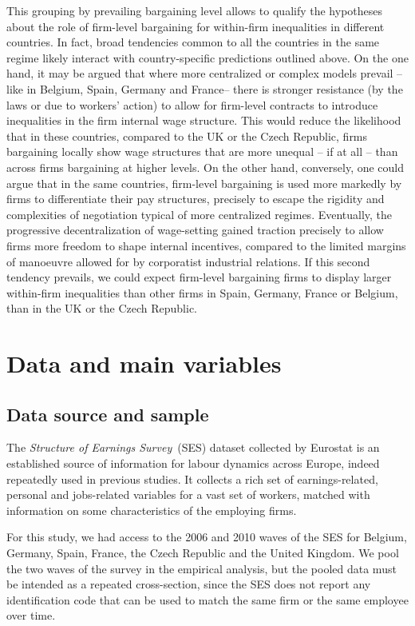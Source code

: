 \documentclass[Review,times,sageh,11pt]{sagej}
\begin{document}
This grouping by prevailing bargaining level allows to qualify the hypotheses about the role of firm-level bargaining for within-firm inequalities in different countries. In fact, broad tendencies common to all the countries in the same regime likely interact with country-specific predictions outlined above. On the one hand, it may be argued that where more centralized or complex models prevail -- like in Belgium, Spain, Germany and France-- there is stronger resistance (by the laws or due to workers' action) to allow for firm-level contracts to introduce inequalities in the firm internal wage structure. This would reduce the likelihood that in these countries, compared to the UK or the Czech Republic, firms bargaining locally show wage structures that are more unequal -- if at all -- than across firms bargaining at higher levels. On the other hand, conversely, one could argue that in the same countries, firm-level bargaining is used more markedly by firms to differentiate their pay structures, precisely to escape the rigidity and complexities of negotiation typical of more centralized regimes. Eventually, the progressive decentralization of wage-setting gained traction precisely to allow firms more freedom to shape internal incentives, compared to the limited margins of manoeuvre allowed for by corporatist industrial relations. If this second tendency prevails, we could expect firm-level bargaining firms to display larger within-firm inequalities than other firms in Spain, Germany, France or Belgium, than in the UK or the Czech Republic.


\section*{Data and main variables}
\label{sec:data}

\subsection*{Data source and sample}
\label{sec:sources}
The \emph{Structure of Earnings Survey}~(SES) dataset collected by Eurostat is an established source of information for labour dynamics across Europe, indeed repeatedly used in previous studies. It collects a rich set of earnings-related, personal and jobs-related variables for a vast set of workers, matched with information on some characteristics of the employing firms.

For this study, we had access to the 2006 and 2010 waves of the SES for Belgium, Germany, Spain, France, the Czech Republic and the United Kingdom. We pool the two waves of the survey in the empirical analysis, but the pooled data must be intended as a repeated cross-section, since the SES does not report any identification code that can be used to match the same firm or the same employee over time.
\end{document}
